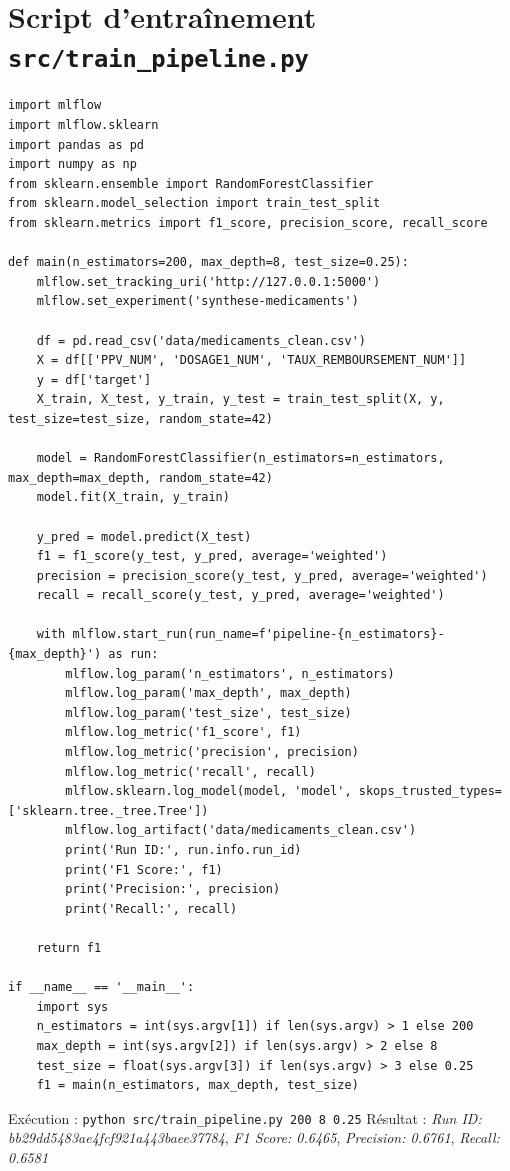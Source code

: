 \documentclass[12pt,a4paper]{report}
\begin{document}
\section{Script d'entraînement \texttt{src/train_pipeline.py}}
\begin{verbatim}
import mlflow
import mlflow.sklearn
import pandas as pd
import numpy as np
from sklearn.ensemble import RandomForestClassifier
from sklearn.model_selection import train_test_split
from sklearn.metrics import f1_score, precision_score, recall_score

def main(n_estimators=200, max_depth=8, test_size=0.25):
    mlflow.set_tracking_uri('http://127.0.0.1:5000')
    mlflow.set_experiment('synthese-medicaments')
    
    df = pd.read_csv('data/medicaments_clean.csv')
    X = df[['PPV_NUM', 'DOSAGE1_NUM', 'TAUX_REMBOURSEMENT_NUM']]
    y = df['target']
    X_train, X_test, y_train, y_test = train_test_split(X, y, test_size=test_size, random_state=42)
    
    model = RandomForestClassifier(n_estimators=n_estimators, max_depth=max_depth, random_state=42)
    model.fit(X_train, y_train)
    
    y_pred = model.predict(X_test)
    f1 = f1_score(y_test, y_pred, average='weighted')
    precision = precision_score(y_test, y_pred, average='weighted')
    recall = recall_score(y_test, y_pred, average='weighted')
    
    with mlflow.start_run(run_name=f'pipeline-{n_estimators}-{max_depth}') as run:
        mlflow.log_param('n_estimators', n_estimators)
        mlflow.log_param('max_depth', max_depth)
        mlflow.log_param('test_size', test_size)
        mlflow.log_metric('f1_score', f1)
        mlflow.log_metric('precision', precision)
        mlflow.log_metric('recall', recall)
        mlflow.sklearn.log_model(model, 'model', skops_trusted_types=['sklearn.tree._tree.Tree'])
        mlflow.log_artifact('data/medicaments_clean.csv')
        print('Run ID:', run.info.run_id)
        print('F1 Score:', f1)
        print('Precision:', precision)
        print('Recall:', recall)
    
    return f1

if __name__ == '__main__':
    import sys
    n_estimators = int(sys.argv[1]) if len(sys.argv) > 1 else 200
    max_depth = int(sys.argv[2]) if len(sys.argv) > 2 else 8
    test_size = float(sys.argv[3]) if len(sys.argv) > 3 else 0.25
    f1 = main(n_estimators, max_depth, test_size)
\end{verbatim}
Exécution : \texttt{python src/train_pipeline.py 200 8 0.25}
Résultat : \textit{Run ID: bb29dd5483ae4fcf921a443baee37784}, \textit{F1 Score: 0.6465}, \textit{Precision: 0.6761}, \textit{Recall: 0.6581}
\end{document}
